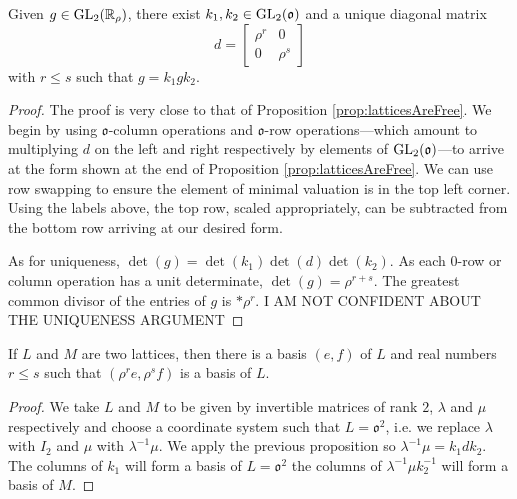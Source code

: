 \documentclass[draft]{amsart}
\begin{document}
    \begin{prop}\label{prop:normalFormMatrices}
        Given \(g\in \mathrm{GL}_2(\mathbb{R}_\rho)\), there exist \(k_1,k_2\in \mathrm{GL}_2(\mathfrak o)\) and a unique diagonal matrix
        \[d=\begin{bmatrix}
            \rho^r & 0 \\ 0 & \rho ^s
        \end{bmatrix}\]
         with \(r\le s\) such that \(g=k_1gk_2\).
    \end{prop}
    \begin{proof}
        The proof is very close to that of Proposition \ref{prop:latticesAreFree}. We begin by using \(\mathfrak o\)-column operations and \(\mathfrak o\)-row operations---which amount to multiplying \(d\) on the left and right respectively by elements of \(\mathrm{GL}_2(\mathfrak o)\)---to arrive at the form shown at the end of Proposition \ref{prop:latticesAreFree}. We can use row swapping to ensure the element of minimal valuation is in the top left corner. Using the labels above, the top row, scaled appropriately, can be subtracted from the bottom row arriving at our desired form.

        As for uniqueness, \(\det(g)=\det(k_1)\det(d)\det(k_2)\). As each \(\mathfrak 0\)-row or column operation has a unit determinate, \(\det(g)=\rho^{r+s}\). The greatest common divisor of the entries of \(g\) is \(*\rho^r\). I AM NOT CONFIDENT ABOUT THE UNIQUENESS ARGUMENT
    \end{proof}

    \begin{corollary}\label{cor:PDT} If \(L\) and \(M\) are two lattices, then there is a basis \((e,f)\) of \(L\) and real numbers \(r\le s\) such that \((\rho^re,\rho^s f)\) is a basis of \(L\).
    \end{corollary}
    \begin{proof}
        We take \(L\) and \(M\) to be given by invertible matrices of rank \(2\), \(\lambda\) and \(\mu\) respectively and choose a coordinate system such that \(L=\mathfrak o^2\), i.e. we replace \(\lambda\) with \(I_2\) and \(\mu\) with \(\lambda^{-1}\mu\). We apply the previous proposition so \(\lambda^{-1}\mu=k_1dk_2\). The columns of \(k_1\) will form a basis of \(L=\mathfrak o^2\) the columns of \(\lambda^{-1}\mu k_2^{-1}\) will form a basis of \(M\).
    \end{proof}
\end{document}
